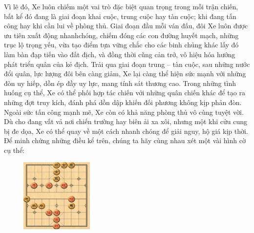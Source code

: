 \vspace*{150pt}
\begin{multicols}{2}

	Vì lẽ đó, Xe luôn chiếm một vai trò đặc biệt quan trọng trong mỗi trận chiến, bất kể đó đang là giai đoạn khai cuộc, trung cuộc hay tàn cuộc; khi đang tấn công hay khi cần lui về phòng thủ. Giai đoạn đầu mỗi ván đấu, đôi Xe luôn được ưu tiên xuất động nhanh\linebreak chóng, chiếm đóng các con đường huyết mạch, những trục lộ trọng yếu, vừa tạo điểm tựa vững chắc cho các binh chủng khác lấy đó làm bàn đạp tiến vào đất địch, và đồng thời cũng cản trở, vô hiệu hóa hướng phát triển quân của kẻ địch. Trải qua giai đoạn trung -- tàn cuộc, sau những nước đổi quân, lực lượng đôi bên càng giảm, Xe lại càng thể hiện sức mạnh với những đòn uy hiếp, dồn ép đầy uy lực, mang tính sát thương cao. Trong những tình huống cụ thể, Xe có thể phối hợp tác chiến với những quân chiến khác để tạo ra những đợt truy kích, đánh phá dồn dập khiến đối phương không kịp \linebreak phản đòn. 
	\vskip 0.1cm
	Ngoài sức tấn công mạnh mẽ, Xe còn có khả năng phòng thủ vô cùng tuyệt vời. Dù cho đang vất vả nơi chiến trường hay biên ải xa xôi, nhưng một khi cửu cung bị đe dọa, Xe có thể quay về một cách nhanh chóng để giải nguy, hộ giá kịp thời.
	Để minh chứng những điều kể trên, chúng ta hãy cùng nhau xét một vài hình cờ cụ thể:
	\begin{figure}[H]
		\vspace*{-5pt}
		\centering
		\captionsetup{labelformat= empty, justification=centering}
		\includegraphics[width= 0.32\textwidth]{1}

\end{figure}
\end{multicols}
